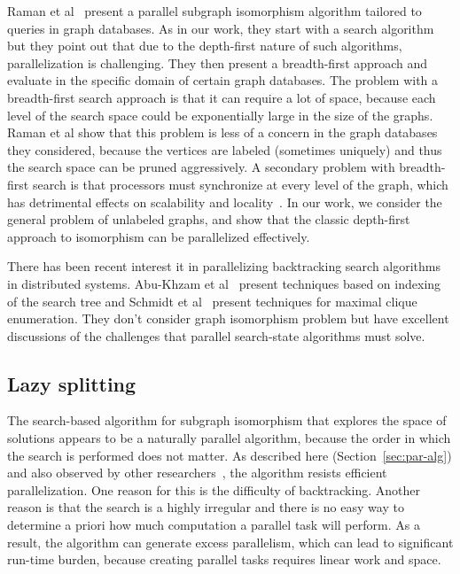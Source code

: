 %
Raman et al~\cite{subgraphdatabase} present a parallel subgraph
isomorphism algorithm tailored to queries in graph
databases.
%
As in our work, they start with a search algorithm but they point out
that due to the depth-first nature of such algorithms, parallelization
is challenging.
%
They then present a breadth-first approach and evaluate in the
specific domain of certain graph databases.
%
The problem with a breadth-first search approach is that it can require a
lot of space, because each level of the search space could be
exponentially large in the size of the graphs.
%
Raman et al show that this problem is less of a concern in the graph
databases they considered, because the vertices are labeled (sometimes
uniquely) and thus the search space can be pruned aggressively.
%
A secondary problem with breadth-first search is that processors must
synchronize at every level of the graph, which has detrimental effects
on scalability and
locality~\cite{endo1997scalable,siebert2010concurrent,flood2001parallel,congkokrlesa08,pdfs-15}.
%
In our work, we consider the general problem of unlabeled graphs, and
show that the classic depth-first approach to
isomorphism can be parallelized effectively.
%

There has been recent interest it in parallelizing backtracking search
algorithms in distributed systems. Abu-Khzam et
al~\cite{S+scalable-2009} present techniques based on indexing of the
search tree and Schmidt et al~\cite{F+scalable-2015} present
techniques for maximal clique enumeration.
%
They don't consider graph isomorphism problem but have excellent
discussions of the challenges that parallel search-state algorithms
must solve.


\subsection{Lazy splitting}
%
The search-based algorithm for subgraph isomorphism that explores the
space of solutions appears to be a naturally parallel algorithm,
because the order in which the search is performed does not matter.
%
As described here (Section~\ref{sec:par-alg}) and also observed by other
researchers~\cite{blankstein,subgraphdatabase}, the algorithm resists
efficient parallelization.
%
%
One reason for this is the difficulty of backtracking.
%
Another reason is that the search is a highly irregular and there is
no easy way to determine a priori how much computation a parallel task
will perform.
%
As a result, the algorithm can generate excess parallelism, which can
lead to significant run-time burden, because creating parallel tasks
requires linear work and space.
%

